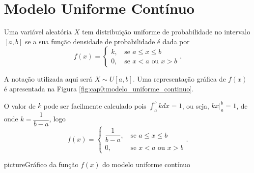 \section{Modelo Uniforme Contínuo}

Uma variável aleatória $X$ tem distribuição uniforme de probabilidade no intervalo $[a,b]$ se a sua função densidade de probabilidade é dada por
\[
	f(x)=\begin{cases}
		k\text{,}&\text{ se } a\leqslant x \leqslant b\\
		0\text{,}&\text{ se } x < a\text{ ou }x>b
	\end{cases}
	\text{.}
\]

A notação utilizada aqui será $X \sim U[a,b]$. Uma representação gráfica de $f(x)$ é apresentada na Figura \ref{fig:cap0:modelo_uniforme_continuo}.

O valor de $k$ pode ser facilmente calculado pois $\displaystyle\int_a^b kdx = 1$, ou seja, $kx\Big|_a^b=1$, de onde $k=\dfrac{1}{b-a}$, logo
\[
	f(x)=\begin{cases}
		\dfrac{1}{b-a}\text{,}&\text{ se } a\leqslant x\leqslant b\\
		0\text{,}&\text{ se }x<a\text{ ou }x>b
	\end{cases}
	\text{.}
\]

\begin{sidepicture}{8cm}{picture}{Gráfico da função $f(x)$ do modelo uniforme contínuo}
	\label{fig:cap0:modelo_uniforme_continuo}
\end{sidepicture}

